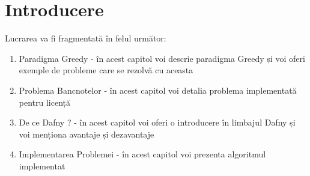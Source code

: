 \chapter*{Introducere} 

Lucrarea va fi fragmentată în felul următor: 
\begin{enumerate}
	\item Paradigma Greedy - în acest capitol voi descrie paradigma Greedy și voi oferi exemple de probleme care se rezolvă cu aceasta
	\item Problema Bancnotelor - în acest capitol voi detalia problema implementată pentru licență
	\item De ce Dafny ?  - în acest capitol voi oferi o introducere în limbajul Dafny și voi menționa avantaje și dezavantaje 
	\item Implementarea Problemei - în acest capitol voi prezenta algoritmul implementat
\end{enumerate}